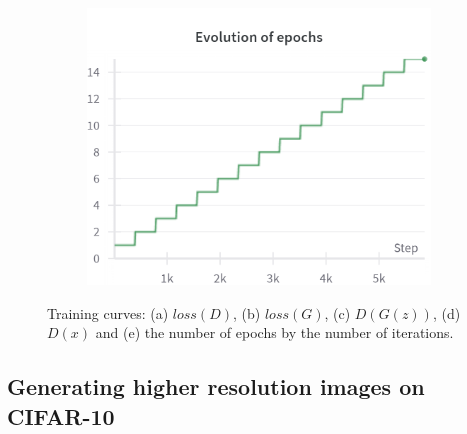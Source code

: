 \begin{figure}[H]
    \begin{subfigure}{0.45\textwidth}
        \centering
        \includegraphics[width=0.95\linewidth]{cifar10/32/epochs.png}
        \caption{}
        \label{subfig:cifar10/32/epochs}
    \end{subfigure}%

    \caption{Training curves: (a) $loss(D)$, (b) $loss(G)$, (c) $D(G(z))$, (d) $D(x)$ and (e) the number of epochs by the number of iterations.}
    \label{fig:cifar10_32_curves}
\end{figure}

\subsection{Generating higher resolution images on CIFAR-10} \label{appendix:cifar10_64}

